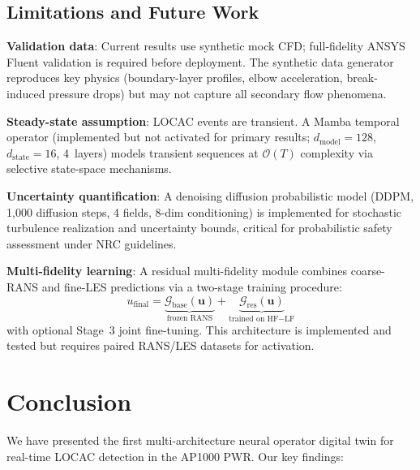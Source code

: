 \documentclass[conference]{IEEEtran}
\begin{document}
\subsection{Limitations and Future Work}

\textbf{Validation data}: Current results use synthetic mock CFD; full-fidelity ANSYS Fluent validation is required before deployment. The synthetic data generator reproduces key physics (boundary-layer profiles, elbow acceleration, break-induced pressure drops) but may not capture all secondary flow phenomena.

\textbf{Steady-state assumption}: LOCAC events are transient. A Mamba temporal operator (implemented but not activated for primary results; $d_\text{model} = 128$, $d_\text{state} = 16$, 4~layers) models transient sequences at $\mathcal{O}(T)$ complexity via selective state-space mechanisms.

\textbf{Uncertainty quantification}: A denoising diffusion probabilistic model (DDPM, 1{,}000 diffusion steps, 4 fields, 8-dim conditioning) is implemented for stochastic turbulence realization and uncertainty bounds, critical for probabilistic safety assessment under NRC guidelines.

\textbf{Multi-fidelity learning}: A residual multi-fidelity module \cite{lu2022multifidelity} combines coarse-RANS and fine-LES predictions via a two-stage training procedure:
\begin{equation}
u_\text{final} = \underbrace{\mathcal{G}_\text{base}(\bm{u})}_\text{frozen RANS} + \underbrace{\mathcal{G}_\text{res}(\bm{u})}_\text{trained on HF$-$LF}
\end{equation}
with optional Stage~3 joint fine-tuning. This architecture is implemented and tested but requires paired RANS/LES datasets for activation.

\section{Conclusion}
\label{sec:conclusion}

We have presented the first multi-architecture neural operator digital twin for real-time LOCAC detection in the AP1000 PWR. Our key findings:
\end{document}
